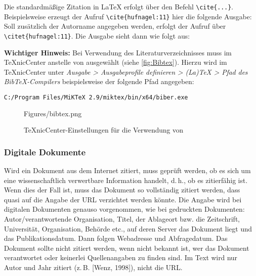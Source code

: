 Die standardmäßige Zitation in LaTeX erfolgt über den Befehl \verb+\cite{...}+. Beispielsweise erzeugt der Aufruf \verb+\cite{hufnagel:11}+ hier die folgende Ausgabe: \cite{hufnagel:11}
Soll zusätzlich der Autorname angegeben werden, erfolgt der Aufruf über \verb+\citet{hufnagel:11}+.
Die Ausgabe sieht dann wie folgt aus: \citet{hufnagel:11}

\textbf{Wichtiger Hinweis:}
Bei Verwendung des Literaturverzeichnisses  muss im TeXnicCenter  anstelle von  ausgewählt (siehe \autoref{fig:Bibtex}).
Hierzu wird im TeXnicCenter unter \emph{Ausgabe > Ausgabeprofile definieren > (La)TeX > Pfad des BibTeX-Compilers} beispielsweise der folgende Pfad angegeben:
\begin{lstlisting}[style=bash]
C:/Program Files/MiKTeX 2.9/miktex/bin/x64/biber.exe
\end{lstlisting}

\begin{figure}[h] %
	\centering
	\begin{overpic}[width=0.7\textwidth]
		{Figures/bibtex.png}
	\end{overpic}
	\caption{TeXnicCenter-Einstellungen für die Verwendung von }
	\label{fig:Bibtex}
\end{figure}


\subsubsection*{Digitale Dokumente}
\label{sub:Digitale Dokumente}

Wird ein Dokument aus dem Internet zitiert, muss geprüft werden, ob es sich um eine wissenschaftlich verwertbare Information handelt, d.\,h., ob es zitierfähig ist.
Wenn dies der Fall ist, muss das Dokument so vollständig zitiert werden, dass quasi auf die Angabe der URL verzichtet werden könnte.
Die Angabe wird bei digitalen Dokumenten genauso vorgenommen, wie bei gedruckten Dokumenten:
Autor/verantwortende Organisation, Titel, der Ablageort bzw. die Zeitschrift, Universität, Organisation, Behörde etc., auf deren Server das Dokument liegt und das Publikationsdatum.
Dann folgen Webadresse und Abfragedatum. Das Dokument sollte nicht zitiert werden, wenn nicht bekannt ist, wer das Dokument verantwortet oder keinerlei Quellenangaben zu finden sind.
Im Text wird nur Autor und Jahr zitiert (z.\,B. [Wenz, 1998]), nicht die URL.

